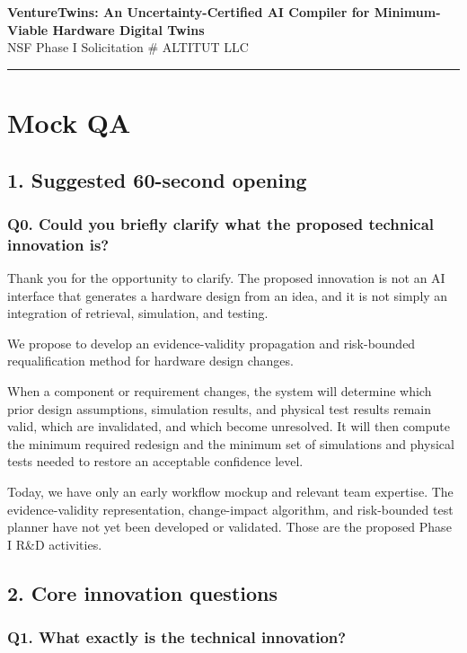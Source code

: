 \documentclass[12pt,letterpaper]{article}
\begin{document}
\begin{center}
{\large\textbf{VentureTwins: An Uncertainty-Certified AI Compiler for Minimum-Viable Hardware Digital Twins}}\\[2pt]
{\small NSF Phase I \quad Solicitation \# \quad ALTITUT LLC}
\end{center}
\vspace{1pt}\hrule\vspace{4pt}


\section{Mock QA}
\subsection{1. Suggested 60-second opening}

\subsubsection{Q0. Could you briefly clarify what the proposed technical innovation is?}

Thank you for the opportunity to clarify. The proposed innovation is not an AI interface that generates a hardware design from an idea, and it is not simply an integration of retrieval, simulation, and testing.

We propose to develop an evidence-validity propagation and risk-bounded requalification method for hardware design changes.

When a component or requirement changes, the system will determine which prior design assumptions, simulation results, and physical test results remain valid, which are invalidated, and which become unresolved. It will then compute the minimum required redesign and the minimum set of simulations and physical tests needed to restore an acceptable confidence level.

Today, we have only an early workflow mockup and relevant team expertise. The evidence-validity representation, change-impact algorithm, and risk-bounded test planner have not yet been developed or validated. Those are the proposed Phase I R\&D activities.

\subsection{2. Core innovation questions}

\subsubsection{Q1. What exactly is the technical innovation?}
\end{document}
